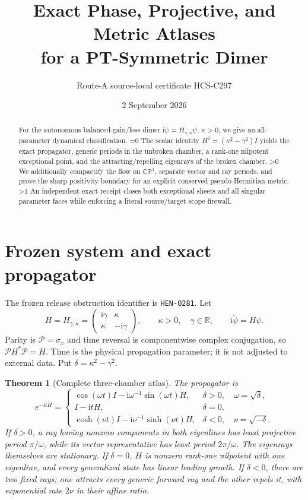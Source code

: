 \documentclass[10pt]{article}
\title{Exact Phase, Projective, and Metric Atlases\\
for a PT-Symmetric Dimer}
\author{Route-A source-local certificate HCS-C297}
\date{2 September 2026}
\providecommand{\CRevisionRound}{2}
\newtheorem{theorem}{Theorem}
\newcommand{\CP}{\mathbb {CP}}
\newcommand{\ii}{\mathrm i}
\begin{document}
\maketitle

\begin{abstract}
For the autonomous balanced-gain/loss dimer
$\ii\dot\psi=H_{\gamma,\kappa}\psi$, $\kappa>0$, we give an
all-parameter dynamical classification.
\ifnum\CRevisionRound=0
The scalar identity $H^2=(\kappa^2-\gamma^2)I$ yields the exact propagator,
generic periods in the unbroken chamber, a rank-one nilpotent exceptional
point, and the attracting/repelling eigenrays of the broken chamber.
\fi
\ifnum\CRevisionRound>0
We additionally compactify the flow on $\CP^1$, separate vector and ray
periods, and prove the sharp positivity boundary for an explicit conserved
pseudo-Hermitian metric.
\fi
\ifnum\CRevisionRound>1
An independent exact receipt closes both exceptional sheets and all singular
parameter faces while enforcing a literal source/target scope firewall.
\fi
\end{abstract}

\section{Frozen system and exact propagator}
The frozen release obstruction identifier is \texttt{HEN-O281}.
Let
\[
 H=H_{\gamma,\kappa}=
 \begin{pmatrix}\ii\gamma&\kappa\\ \kappa&-\ii\gamma\end{pmatrix},
 \qquad \kappa>0,\quad\gamma\in\mathbb R,
 \qquad \ii\dot\psi=H\psi.
\]
Parity is $\mathcal P=\sigma_x$ and time reversal is componentwise complex
conjugation, so $\mathcal P H^*\mathcal P=H$.  Time is the physical
propagation parameter; it is not adjusted to external data.  Put
$\delta=\kappa^2-\gamma^2$.

\begin{theorem}[Complete three-chamber atlas]\label{thm:atlas}
The propagator is
\[
e^{-\ii tH}=\begin{cases}
\cos(\omega t)I-\ii\omega^{-1}\sin(\omega t)H,
 &\delta>0,\quad\omega=\sqrt\delta,\\[3pt]
I-\ii tH,&\delta=0,\\[3pt]
\cosh(\nu t)I-\ii\nu^{-1}\sinh(\nu t)H,
 &\delta<0,\quad\nu=\sqrt{-\delta}.
\end{cases}
\]
If $\delta>0$, a ray having nonzero components in both eigenlines has least
projective period $\pi/\omega$, while its vector representative has least
period $2\pi/\omega$.  The eigenrays themselves are stationary.  If
$\delta=0$, $H$ is nonzero rank-one nilpotent with one eigenline, and every
generalized state has linear leading growth.  If $\delta<0$, there are two
fixed rays; one attracts every generic forward ray and the other repels it,
with exponential rate $2\nu$ in their affine ratio.
\end{theorem}
\end{document}
